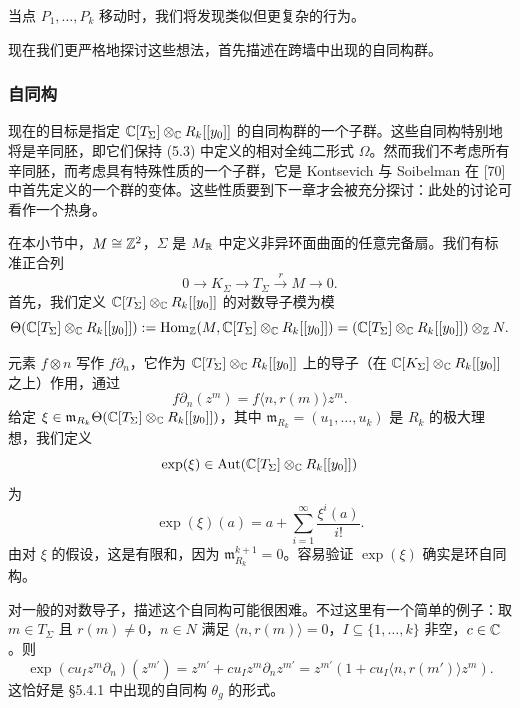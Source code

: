 当点 $P_1,\ldots,P_k$ 移动时，我们将发现类似但更复杂的行为。

现在我们更严格地探讨这些想法，首先描述在跨墙中出现的自同构群。

\subsubsection{自同构}

现在的目标是指定 $\mathbb{C}[T_\Sigma]\otimes_{\mathbb{C}} R_k[[y_0]]$ 的自同构群的一个子群。这些自同构特别地将是辛同胚，即它们保持 (5.3) 中定义的相对全纯二形式 $\Omega$。然而我们不考虑所有辛同胚，而考虑具有特殊性质的一个子群，它是 Kontsevich 与 Soibelman 在 [70] 中首先定义的一个群的变体。这些性质要到下一章才会被充分探讨：此处的讨论可看作一个热身。

在本小节中，$M\cong\mathbb{Z}^2$，$\Sigma$ 是 $M_{\mathbb{R}}$ 中定义非异环面曲面的任意完备扇。我们有标准正合列
\[
  0\to K_\Sigma\to T_\Sigma\xrightarrow{\ r\ }M\to 0.
\]
首先，我们定义 $\mathbb{C}[T_\Sigma]\otimes_{\mathbb{C}} R_k[[y_0]]$ 的对数导子模为模
\[
  \Theta(\mathbb{C}[T_\Sigma]\otimes_{\mathbb{C}} R_k[[y_0]])
  :=\operatorname{Hom}_{\mathbb{Z}}(M,\mathbb{C}[T_\Sigma]\otimes_{\mathbb{C}} R_k[[y_0]])
  =(\mathbb{C}[T_\Sigma]\otimes_{\mathbb{C}} R_k[[y_0]])\otimes_{\mathbb{Z}} N.
\]

元素 $f\otimes n$ 写作 $f\partial_n$，它作为 $\mathbb{C}[T_\Sigma]\otimes_{\mathbb{C}} R_k[[y_0]]$ 上的导子（在 $\mathbb{C}[K_\Sigma]\otimes_{\mathbb{C}} R_k[[y_0]]$ 之上）作用，通过
\[
  f\partial_n(z^m)=f\langle n,r(m)\rangle z^m.
\]
给定 $\xi\in\mathfrak m_{R_k}\Theta(\mathbb{C}[T_\Sigma]\otimes_{\mathbb{C}} R_k[[y_0]])$，其中 $\mathfrak m_{R_k}=(u_1,\ldots,u_k)$ 是 $R_k$ 的极大理想，我们定义
\[
  \exp(\xi)\in\operatorname{Aut}(\mathbb{C}[T_\Sigma]\otimes_{\mathbb{C}} R_k[[y_0]])
\]
为
\[
  \exp(\xi)(a)=a+\sum_{i=1}^{\infty}\frac{\xi^i(a)}{i!}.
\]
由对 $\xi$ 的假设，这是有限和，因为 $\mathfrak m_{R_k}^{k+1}=0$。容易验证 $\exp(\xi)$ 确实是环自同构。


对一般的对数导子，描述这个自同构可能很困难。不过这里有一个简单的例子：取 $m\in T_\Sigma$ 且 $r(m)\ne0$，$n\in N$ 满足 $\langle n,r(m)\rangle=0$，$I\subseteq\{1,\ldots,k\}$ 非空，$c\in\mathbb{C}$。则
\begin{equation}
  \exp(cu_Iz^m\partial_n)(z^{m'})=z^{m'}+cu_Iz^m\partial_nz^{m'}
  =z^{m'}(1+cu_I\langle n,r(m')\rangle z^m). \tag{5.9}
\end{equation}
这恰好是 §5.4.1 中出现的自同构 $\theta_g$ 的形式。

